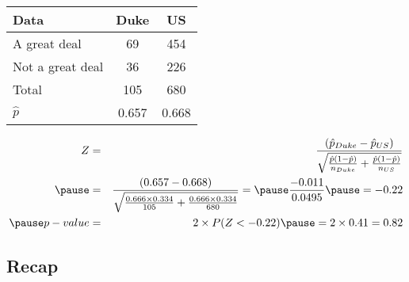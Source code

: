 \documentclass[slidestop,compress,mathserif]{beamer}
\newcommand{\soln}[1]{\textit{#1}}
\begin{document}
\begin{frame}
\frametitle{}


{\footnotesize
\begin{center}
\begin{tabular}{l | c c}
Data			& Duke		& US \\
\hline
A great deal	& 69			& 454 \\
Not a great deal& 36			& 226 \\
\hline
Total			& 105		& 680 \\
\hline
$\hat{p}$		& 0.657		& 0.668
\end{tabular}
\end{center}
}

\pause

\soln{
\begin{eqnarray*}
Z &=& \frac{(\hat{p}_{Duke} - \hat{p}_{US})}{\sqrt{ \frac{ \hat{p} (1 - \hat{p})}{n_{Duke} } + \frac{ \hat{p} (1 -  \hat{p})}{n_{US} } }} \\
\pause 
&=& \frac{(0.657 - 0.668)}{\sqrt{ \frac{0.666 \times 0.334}{105} + \frac{0.666 \times 0.334}{680} }} = \pause \frac{-0.011}{0.0495} \pause = -0.22 \\
\pause
p-value &=& 2 \times P(Z < -0.22) \pause = 2 \times 0.41 = 0.82
\end{eqnarray*}
}

\end{frame}



\subsection{Recap}

\end{document}
